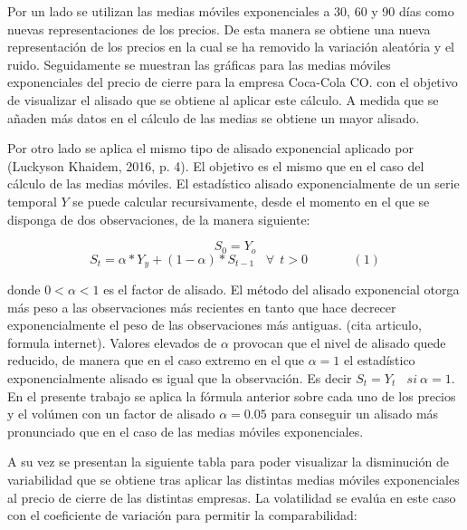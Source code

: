 \documentclass[]{DissertateUSU}
\begin{document}
\setlength\parskip{7ex}

\noindent Por un lado se utilizan las medias móviles exponenciales a 30,
60 y 90 días como nuevas representaciones de los precios. De esta manera
se obtiene una nueva representación de los precios en la cual se ha
removido la variación aleatória y el ruido. Seguidamente se muestran las
gráficas para las medias móviles exponenciales del precio de cierre para
la empresa Coca-Cola CO. con el objetivo de visualizar el alisado que se
obtiene al aplicar este cálculo. A medida que se añaden más datos en el
cálculo de las medias se obtiene un mayor alisado.

\justifying

\noindent Por otro lado se aplica el mismo tipo de alisado exponencial
aplicado por (Luckyson Khaidem, 2016, p. 4). El objetivo es el mismo que
en el caso del cálculo de las medias móviles. El estadístico alisado
exponencialmente de un serie temporal \(Y\) se puede calcular
recursivamente, desde el momento en el que se disponga de dos
observaciones, de la manera siguiente:

\setlength\parskip{5ex}

\[ S_0 = Y_o \]
\[ S_t = \alpha*Y_y+(1-\alpha)*S_{t-1} \ \ \ \ \forall \ \ t>0 \ \ \ \ \ \ \ \ \ \ \ \ \ \ \ \ (1)\]

\setlength\parskip{8ex}

\noindent donde \(0 < \alpha < 1\) es el factor de alisado. El método
del alisado exponencial otorga más peso a las observaciones más
recientes en tanto que hace decrecer exponencialmente el peso de las
observaciones más antiguas. (cita articulo, formula internet). Valores
elevados de \(\alpha\) provocan que el nivel de alisado quede reducido,
de manera que en el caso extremo en el que \(\alpha=1\) el estadístico
exponencialmente alisado es igual que la observación. Es decir
\(S_t=Y_t \ \ \ \ si \ \alpha=1\). En el presente trabajo se aplica la
fórmula anterior sobre cada uno de los precios y el volúmen con un
factor de alisado \(\alpha=0.05\) para conseguir un alisado más
pronunciado que en el caso de las medias móviles exponenciales.

\justifying

\noindent A su vez se presentan la siguiente tabla para poder visualizar
la disminución de variabilidad que se obtiene tras aplicar las distintas
medias móviles exponenciales al precio de cierre de las distintas
empresas. La volatilidad se evalúa en este caso con el coeficiente de
variación para permitir la comparabilidad:
\end{document}
